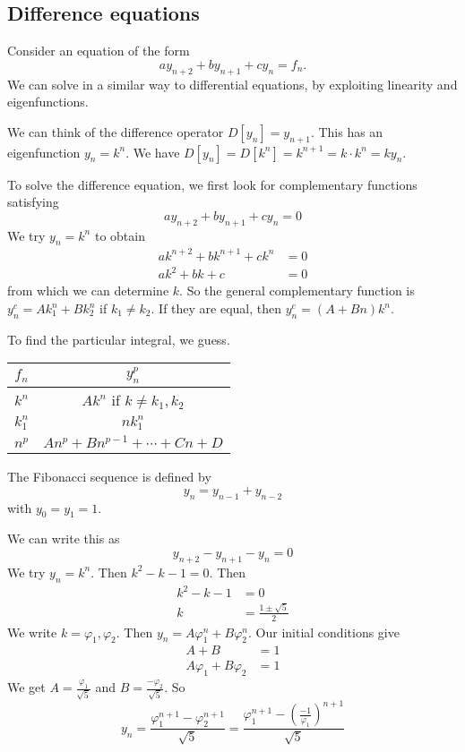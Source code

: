 \documentclass[a4paper]{article}
\begin{document}
\subsection{Difference equations}
Consider an equation of the form
\[
  a y_{n + 2} + by_{n + 1} + cy_n = f_n.
\]
We can solve in a similar way to differential equations, by exploiting linearity and eigenfunctions.

We can think of the difference operator $D[y_n] = y_{n + 1}$. This has an eigenfunction $y_n = k^n$. We have $D[y_n] = D[k^n] = k^{n + 1} = k\cdot k^n = ky_n$.

To solve the difference equation, we first look for complementary functions satisfying
\[
  ay_{n + 2} + by_{n + 1} + cy_n = 0
\]
We try $y_n = k^n$ to obtain
\begin{align*}
  ak^{n + 2} + bk^{n + 1} + ck^n &= 0\\
  ak^2 + bk + c &= 0
\end{align*}
from which we can determine $k$. So the general complementary function is $y_n^c = Ak_1^n + Bk_2^n$ if $k_1 \not= k_2$. If they are equal, then $y_n^c = (A + Bn)k^n$.

To find the particular integral, we guess.
\begin{center}
  \begin{tabular}{cc}
    \toprule
    $f_n$ & $y_n^p$\\
    \midrule
    $k^n$ & $Ak^n$ if $k \not= k_1, k_2$\\
    $k_1^n$ & $nk_1^n$\\
    $n^p$ & $An^p + Bn^{p - 1} + \cdots + Cn + D$\\
    \bottomrule
  \end{tabular}
\end{center}

\begin{eg}
  The Fibonacci sequence is defined by
  \[
    y_n = y_{n - 1} + y_{n - 2}
  \]
  with $y_0 = y_1 = 1$.

  We can write this as
  \[
    y_{n + 2} - y_{n + 1} - y_n = 0
  \]
  We try $y_n = k^n$. Then $k^2 - k - 1 = 0$. Then
  \begin{align*}
    k^2 - k - 1 &= 0\\
    k &= \frac{1 \pm \sqrt{5}}{2}
  \end{align*}
  We write $k = \varphi_1, \varphi_2$. Then $y_n = A\varphi_1^n + B\varphi_2^n$. Our initial conditions give
  \begin{align*}
    A + B &= 1\\
    A\varphi_1 + B\varphi_2 &= 1
  \end{align*}
  We get $\displaystyle A = \frac{\varphi_1}{\sqrt{5}}$ and $\displaystyle B = \frac{-\varphi_2}{\sqrt{5}}$. So
  \[
    y_n = \frac{\varphi_1^{n + 1} - \varphi_2^{n + 1}}{\sqrt{5}} = \frac{\varphi_1^{n + 1} - \left(\frac{-1}{\varphi_1}\right)^{n + 1}}{\sqrt{5}}
  \]
\end{eg}
\end{document}
